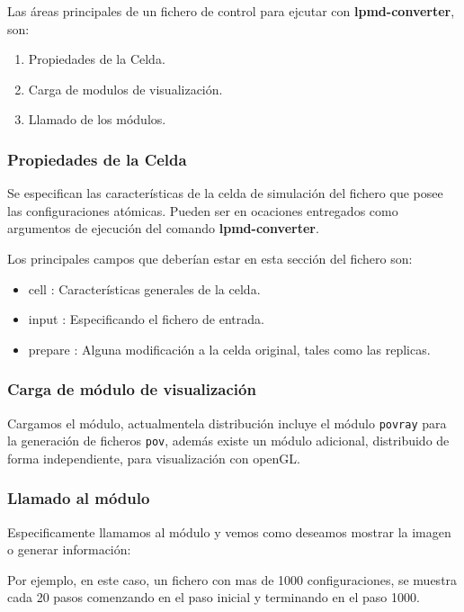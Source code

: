 Las \'areas principales de un fichero de control para ejcutar con \textbf{lpmd-converter}, son:

\begin{enumerate}
 \item Propiedades de la Celda.
 \item Carga de modulos de visualizaci\'on.
 \item Llamado de los m\'odulos.
\end{enumerate}

\subsubsection{Propiedades de la Celda}
Se especifican las caracter\'isticas de la celda de simulaci\'on del fichero que posee las configuraciones at\'omicas. Pueden ser en ocaciones entregados como argumentos de ejecuci\'on del comando \textbf{lpmd-converter}.

Los principales campos que deber\'ian estar en esta secci\'on del fichero son:
\begin{itemize}
 \item cell : Caracter\'isticas generales de la celda.
 \item input : Especificando el fichero de entrada.
 \item prepare : Alguna modificaci\'on a la celda original, tales como las replicas.
\end{itemize}
\subsubsection{Carga de m\'odulo de visualizaci\'on}
Cargamos el m\'odulo, actualmentela distribuci\'on incluye el m\'odulo \verb|povray| para la generaci\'on de ficheros \verb|pov|, adem\'as existe un m\'odulo adicional, distribuido de forma independiente, para visualizaci\'on con openGL.

\subsubsection{Llamado al m\'odulo}
Especificamente llamamos al m\'odulo y vemos como deseamos mostrar la imagen o generar informaci\'on:


Por ejemplo, en este caso, un fichero con mas de 1000 configuraciones, se muestra cada 20 pasos comenzando en el paso inicial y terminando en el paso 1000.


